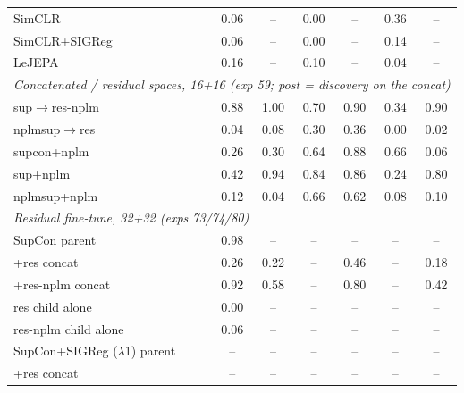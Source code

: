 \begin{center}
\begin{longtable}{lcccccc}
\quad SimCLR & 0.06 & -- & 0.00 & -- & 0.36 & -- \\
\quad SimCLR+SIGReg & 0.06 & -- & 0.00 & -- & 0.14 & -- \\
\quad LeJEPA & 0.16 & -- & 0.10 & -- & 0.04 & -- \\
\multicolumn{7}{l}{\emph{Concatenated / residual spaces, 16+16 (exp 59; post = discovery on the concat)}} \\
\quad sup$\to$res-nplm & 0.88 & 1.00 & 0.70 & 0.90 & 0.34 & 0.90 \\
\quad nplmsup$\to$res & 0.04 & 0.08 & 0.30 & 0.36 & 0.00 & 0.02 \\
\quad supcon+nplm & 0.26 & 0.30 & 0.64 & 0.88 & 0.66 & 0.06 \\
\quad sup+nplm & 0.42 & 0.94 & 0.84 & 0.86 & 0.24 & 0.80 \\
\quad nplmsup+nplm & 0.12 & 0.04 & 0.66 & 0.62 & 0.08 & 0.10 \\
\multicolumn{7}{l}{\emph{Residual fine-tune, 32+32 (exps 73/74/80)}} \\
\quad SupCon parent & 0.98 & -- & -- & -- & -- & -- \\
\quad\quad +res concat & 0.26 & 0.22 & -- & 0.46 & -- & 0.18 \\
\quad\quad +res-nplm concat & 0.92 & 0.58 & -- & 0.80 & -- & 0.42 \\
\quad\quad res child alone & 0.00 & -- & -- & -- & -- & -- \\
\quad\quad res-nplm child alone & 0.06 & -- & -- & -- & -- & -- \\
\quad SupCon+SIGReg ($\lambda$1) parent & -- & -- & -- & -- & -- & -- \\
\quad\quad +res concat & -- & -- & -- & -- & -- & -- \\
\end{longtable}
\end{center}
